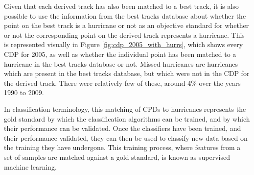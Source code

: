 \documentclass[pdftex,12pt,a4paper]{report}
\begin{document}
Given that each derived track has also been matched to a best track, it is also possible to use the
information from the best tracks database about whether the point on the best track is a hurricane or
not as an objective standard for whether or not the corresponding point on the derived track
represents a hurricane. This is represented visually in Figure \ref{fig:cdp_2005_with_hurrs}, which
shows every CDP for 2005, as well as whether the individual point has been matched to a
hurricane in the best tracks database or not. Missed hurricanes are hurricanes which are present in
the best tracks database, but which were not in the CDP for the derived track. 
There were relatively few of these, around 4\% over the years 1990 to 2009. 

In classification terminology, this matching of CPDs to hurricanes represents the gold standard by
which the classification algorithms can be trained, and by which their performance can be validated.
Once the classifiers have been trained, and their performance validated, they can then be used to
classify new data based on the training they have undergone. This training process, where features
from a set of samples are matched against a gold standard, is known as supervised machine learning.

\end{document}
